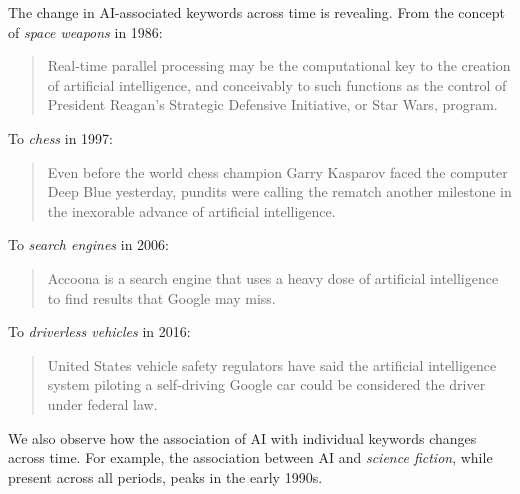 \documentclass[letterpaper]{article}
\begin{document}
The change in AI-associated keywords across time is revealing. From the concept of \textit{space weapons} in 1986:
\begin{quote}
\small
Real-time parallel processing may be the computational key to the creation of artificial intelligence, and conceivably to such functions as the control of President Reagan's Strategic Defensive Initiative, or Star Wars, program.
\normalsize
\end{quote}
To \textit{chess} in 1997:
\begin{quote}
\small
Even before the world chess champion Garry Kasparov faced the computer Deep Blue yesterday, pundits were calling the rematch another milestone in the inexorable advance of artificial intelligence.
\normalsize
\end{quote}
To \textit{search engines} in 2006:
\begin{quote}
\small
Accoona is a search engine that uses a heavy dose of artificial intelligence to find results that Google may miss.
\normalsize
\end{quote}
To \textit{driverless vehicles} in 2016: 
\begin{quote}
\small
United States vehicle safety regulators have said the artificial intelligence system piloting a self-driving Google car could be considered the driver under federal law.
\normalsize
\end{quote}

We also observe how the association of AI with individual keywords changes across time. For example, the association between AI and \textit{science fiction}, while present across all periods, peaks in the early 1990s. %


\end{document}
